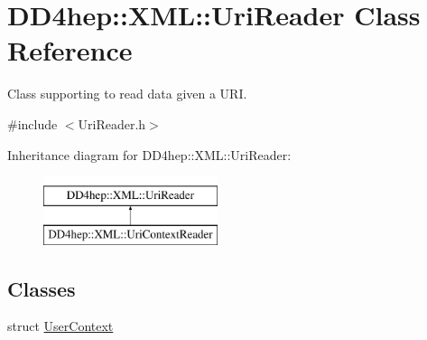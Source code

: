 \hypertarget{class_d_d4hep_1_1_x_m_l_1_1_uri_reader}{}\section{D\+D4hep\+:\+:X\+ML\+:\+:Uri\+Reader Class Reference}
\label{class_d_d4hep_1_1_x_m_l_1_1_uri_reader}


Class supporting to read data given a U\+RI.  




{\ttfamily \#include $<$Uri\+Reader.\+h$>$}

Inheritance diagram for D\+D4hep\+:\+:X\+ML\+:\+:Uri\+Reader\+:\begin{figure}[H]
\begin{center}
\leavevmode
\includegraphics[height=2.000000cm]{class_d_d4hep_1_1_x_m_l_1_1_uri_reader}
\end{center}
\end{figure}
\subsection*{Classes}
\begin{DoxyCompactItemize}
\item 
struct \hyperlink{struct_d_d4hep_1_1_x_m_l_1_1_uri_reader_1_1_user_context}{User\+Context}
\end{DoxyCompactItemize}
